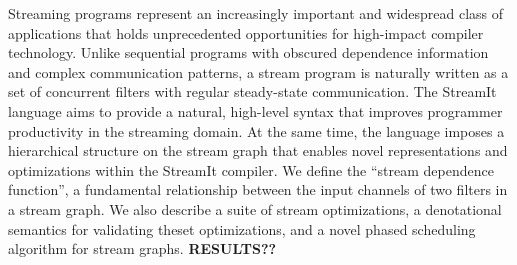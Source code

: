 Streaming programs represent an increasingly important and widespread
class of applications that holds unprecedented opportunities for
high-impact compiler technology.  Unlike sequential programs with
obscured dependence information and complex communication patterns, a
stream program is naturally written as a set of concurrent filters
with regular steady-state communication.  The StreamIt language aims
to provide a natural, high-level syntax that improves programmer
productivity in the streaming domain.  At the same time, the language
imposes a hierarchical structure on the stream graph that enables
novel representations and optimizations within the StreamIt compiler.
We define the ``stream dependence function'', a fundamental
relationship between the input channels of two filters in a stream
graph.  We also describe a suite of stream optimizations, a
denotational semantics for validating theset optimizations, and a
novel phased scheduling algorithm for stream graphs.  {\bf RESULTS??}
